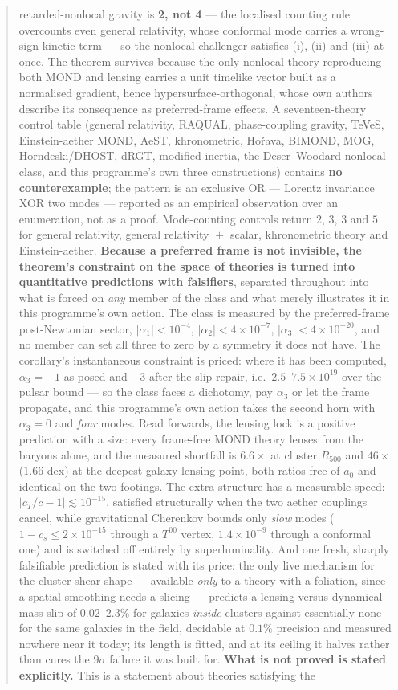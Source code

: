 \documentclass[11pt,letterpaper]{article}
\begin{document}
\begin{abstract}
retarded-nonlocal gravity is \textbf{2, not 4} --- the localised counting rule overcounts even general relativity, whose conformal mode carries a wrong-sign kinetic term --- so the nonlocal challenger satisfies (i), (ii) and (iii) at once. The theorem survives because the only nonlocal theory reproducing both MOND and lensing carries a unit timelike vector built as a normalised gradient, hence hypersurface-orthogonal, whose own authors describe its consequence as preferred-frame effects. A seventeen-theory control table (general relativity, RAQUAL, phase-coupling gravity, TeVeS, Einstein-aether MOND, AeST, khronometric, Ho\v{r}ava, BIMOND, MOG, Horndeski/DHOST, dRGT, modified inertia, the Deser--Woodard nonlocal class, and this programme's own three constructions) contains \textbf{no counterexample}; the pattern is an exclusive OR --- Lorentz invariance XOR two modes --- reported as an empirical observation over an enumeration, not as a proof. Mode-counting controls return $2$, $3$, $3$ and $5$ for general relativity, general relativity ${}+{}$ scalar, khronometric theory and Einstein-aether. \textbf{Because a preferred frame is not invisible, the theorem's constraint on the space of theories is turned into quantitative predictions with falsifiers}, separated throughout into what is forced on \emph{any} member of the class and what merely illustrates it in this programme's own action. The class is measured by the preferred-frame post-Newtonian sector, $|\alpha_1|<10^{-4}$, $|\alpha_2|<4\times10^{-7}$, $|\alpha_3|<4\times10^{-20}$, and no member can set all three to zero by a symmetry it does not have. The corollary's instantaneous constraint is priced: where it has been computed, $\alpha_3=-1$ as posed and $-3$ after the slip repair, i.e.\ $2.5$--$7.5\times10^{19}$ over the pulsar bound --- so the class faces a dichotomy, pay $\alpha_3$ or let the frame propagate, and this programme's own action takes the second horn with $\alpha_3=0$ and \emph{four} modes. Read forwards, the lensing lock is a positive prediction with a size: every frame-free MOND theory lenses from the baryons alone, and the measured shortfall is $6.6\times$ at cluster $R_{500}$ and $46\times$ ($1.66$ dex) at the deepest galaxy-lensing point, both ratios free of $a_0$ and identical on the two footings. The extra structure has a measurable speed: $|c_T/c-1|\lesssim10^{-15}$, satisfied structurally when the two aether couplings cancel, while gravitational Cherenkov bounds only \emph{slow} modes ($1-c_s\le2\times10^{-15}$ through a $T^{00}$ vertex, $1.4\times10^{-9}$ through a conformal one) and is switched off entirely by superluminality. And one fresh, sharply falsifiable prediction is stated with its price: the only live mechanism for the cluster shear shape --- available \emph{only} to a theory with a foliation, since a spatial smoothing needs a slicing --- predicts a lensing-versus-dynamical mass slip of $0.02$--$2.3\%$ for galaxies \emph{inside} clusters against essentially none for the same galaxies in the field, decidable at $0.1\%$ precision and measured nowhere near it today; its length is fitted, and at its ceiling it halves rather than cures the $9\sigma$ failure it was built for. \textbf{What is not proved is stated explicitly.} This is a statement about theories satisfying the 
\end{abstract}
\end{document}
